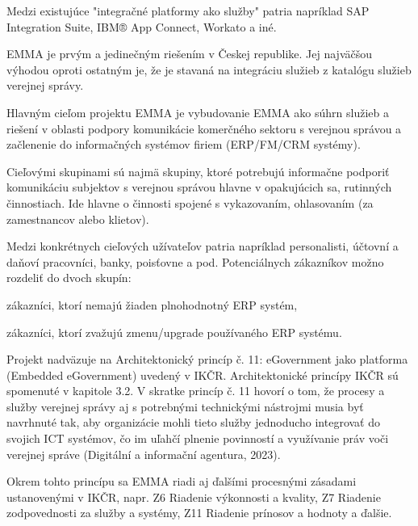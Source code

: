 Medzi existujúce "integračné platformy ako služby" patria napríklad SAP Integration Suite, IBM® App Connect, Workato a iné.

EMMA je prvým a jedinečným riešením v Českej republike. Jej najväčšou výhodou oproti ostatným je, že je stavaná na integráciu služieb z katalógu služieb verejnej správy.

Hlavným cieľom projektu EMMA je vybudovanie EMMA ako súhrn služieb a riešení v oblasti podpory komunikácie komerčného sektoru s verejnou správou a začlenenie do informačných systémov firiem (ERP/FM/CRM systémy).

Cieľovými skupinami sú najmä skupiny, ktoré potrebujú informačne podporiť komunikáciu subjektov s verejnou správou hlavne v opakujúcich sa, rutinných činnostiach.  Ide hlavne o činnosti spojené s vykazovaním, ohlasovaním (za zamestnancov alebo klietov). 


\blank
Medzi konkrétnych cieľových užívateľov patria napríklad personalisti, účtovní a daňoví pracovníci, banky, poisťovne a pod. Potenciálnych zákazníkov možno rozdeliť do dvoch skupín: 

\startitemize[a]
\item{zákazníci, ktorí nemajú žiaden plnohodnotný ERP systém,}
\item{zákazníci, ktorí zvažujú zmenu/upgrade používaného ERP systému.}
\stopitemize

Projekt nadväzuje na Architektonický princíp č. 11: eGovernment jako platforma (Embedded eGovernment) uvedený v IKČR. Architektonické princípy IKČR sú spomenuté v kapitole 3.2. V skratke princíp č. 11 hovorí o tom, že procesy a služby verejnej správy aj s potrebnými technickými nástrojmi musia byť navrhnuté tak, aby organizácie mohli tieto služby jednoducho integrovať do svojich ICT systémov, čo im uľahčí plnenie povinností a využívanie práv voči verejnej správe \scr(Digitální a informační agentura, 2023).

Okrem tohto princípu sa EMMA riadi aj ďalšími procesnými zásadami ustanovenými v IKČR, napr. Z6 Riadenie výkonnosti a kvality, Z7 Riadenie zodpovednosti za služby a systémy, Z11 Riadenie prínosov a hodnoty a ďalšie.

